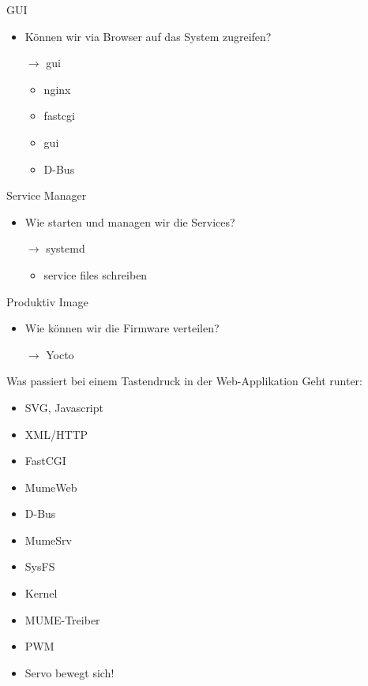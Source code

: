 \begin{frame}{GUI}
	\begin{itemize}
		\item Können wir via Browser auf das System zugreifen?
		\item[$\rightarrow$] gui
		\begin{itemize}
			\item nginx
			\item fastcgi
			\item gui
			\item D-Bus
		\end{itemize}
	\end{itemize}
\end{frame}

\begin{frame}{Service Manager}
	\begin{itemize}
		\item Wie starten und managen wir die Services?
		\item[$\rightarrow$] systemd
		\begin{itemize}
			\item service files schreiben
		\end{itemize}
	\end{itemize}
\end{frame}

\begin{frame}{Produktiv Image}
	\begin{itemize}
		\item Wie können wir die Firmware verteilen?
		\item[$\rightarrow$] Yocto
	\end{itemize}
\end{frame}

\begin{frame}{Was passiert bei einem Tastendruck in der Web-Applikation}
	Geht runter:
	\begin{itemize}
		\item SVG, Javascript
		\item XML/HTTP
		\item FastCGI
		\item MumeWeb
		\item D-Bus
		\item MumeSrv
		\item SysFS
		\item Kernel
		\item MUME-Treiber
		\item PWM
		\item Servo bewegt sich!
	\end{itemize}
\end{frame}

